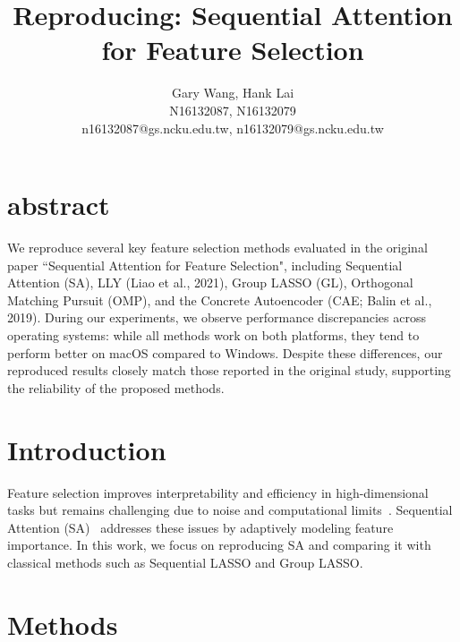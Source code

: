 \documentclass[a4paper,twocolumn]{article} %
\begin{document}

\title{Reproducing: Sequential Attention for Feature Selection}
\author{Gary Wang, Hank Lai \\ N16132087, N16132079 \\ n16132087@gs.ncku.edu.tw, n16132079@gs.ncku.edu.tw} 


\maketitle                     %

\section{abstract}
We reproduce several key feature selection methods evaluated in the original paper ``Sequential Attention for Feature Selection", including Sequential Attention (SA), LLY (Liao et al., 2021), Group LASSO (GL), Orthogonal Matching Pursuit (OMP), and the Concrete Autoencoder (CAE; Balin et al., 2019). During our experiments, we observe performance discrepancies across operating systems: while all methods work on both platforms, they tend to perform better on macOS compared to Windows. Despite these differences, our reproduced results closely match those reported in the original study, supporting the reliability of the proposed methods.


\section{Introduction}

Feature selection improves interpretability and efficiency in high-dimensional tasks but remains challenging due to noise and computational limits~\cite{nordling2013}. Sequential Attention (SA)~\cite{yasuda2023} addresses these issues by adaptively modeling feature importance. In this work, we focus on reproducing SA and comparing it with classical methods such as Sequential LASSO and Group LASSO.
\section{Methods}
\end{document}
